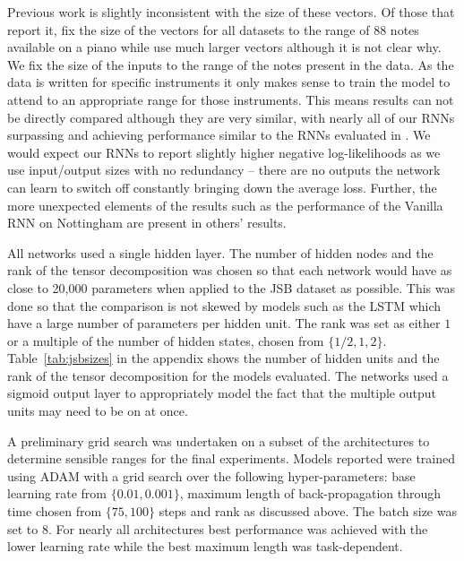 Previous work is slightly inconsistent with the size of these vectors. Of those that
report it, \autocite{Boulanger-Lewandowski2012} fix the size of the vectors for all
datasets to the range of 88 notes available on a piano while \autocite{Chung2014}
use much larger vectors although it is not clear why. We fix the size of the
inputs to the range of the notes present in the data. As the data is
written for specific instruments it only makes sense to train the model to attend
to an appropriate range for those instruments. This means
results can not be directly compared although they are very similar,
with nearly all of our RNNs surpassing \autocite{Chung2014} and achieving performance
similar to the RNNs evaluated in \autocite{Boulanger-Lewandowski2012}. We would
expect our RNNs to report slightly higher negative log-likelihoods as we use input/output
sizes with no redundancy -- there are no outputs the network can learn to switch off
constantly bringing down the average loss.
Further, the more unexpected elements of the results such as the performance of the
Vanilla RNN on Nottingham are present in others' results.

All networks used a single hidden layer. The number of hidden nodes and the rank of
the tensor decomposition was chosen so that each network would have as close to
20,000 parameters when applied to the JSB dataset as possible. This was done 
so that the comparison is not skewed by models such as
the LSTM which have a large number of parameters per hidden unit. The rank was set as
either \(1\) or a multiple of the number of hidden states, chosen from \(\{1/2, 1, 2\}\).
Table~\ref{tab:jsbsizes} in the appendix shows the number of hidden units and the rank of the tensor
decomposition for the models evaluated. The networks used a sigmoid output layer to
appropriately model the fact that the multiple output units may need to be on at once.


A preliminary grid search was undertaken on a subset of the architectures to determine
sensible ranges for the final experiments. Models reported were trained using ADAM with
a grid search over the following hyper-parameters: base learning rate from \(\{0.01, 0.001\}\),
maximum length of back-propagation through time chosen from \(\{75, 100\}\) steps
and rank as discussed above. The batch size was set to \(8\). For nearly all architectures 
best performance was
achieved with the lower learning rate while the best maximum length was task-dependent.

